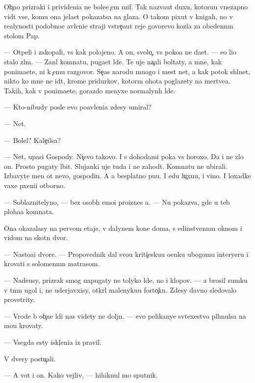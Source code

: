 \documentclass[10pt]{book}
\begin{document}
Ob{\yi}{\c}no prizraki i privideni{\y}a ne bole{\y}e {\c}em mif. Tak naz{\yi}va{\y}ut duxu, kotoru{\y}u vnezapno vid{\ia}t vse, komu ona jela{\y}et pokazatsa na glaza. O takom pixut v knigah, no v realynosti podobno{\y}e {\y}avleni{\y}e straji vstre{\c}a{\y}ut reje govor{\ia}{\x}evo kozla za obedenn{\yi}m stolom Pap{\yi}.

— Otpeli i zakopali, vs{\e} kak polojeno. A on, svolo{\c}, vs{\e} poko{\y}a ne da{\y}et. — {\y}e{\y}o li{\q}o stalo zl{\yi}m. — Zan{\ia}l komnatu, puga{\y}et l{\iu}de{\y}. Te uje na{\c}ali boltaty, a mne, kak ponima{\y}ete, ni k {\c}emu razgovor{\yi}. Se{\y}{\c}as narodu mnogo i mest net, a kak potok shl{\yi}net, nikto ko mne ne id{\e}t, krome pridurkov, kotor{\yi}m ohota poglazety na mertve{\q}a. Takih, kak v{\yi} ponima{\y}ete, gorazdo menyxe normalyn{\yi}h l{\iu}de{\y}.

— Kto-nibudy posle {\y}evo po{\y}avleni{\y}a zdesy umiral?

— Net.

— Bolel? Kale{\c}ilsa?

— Net, upasi Gospody. Ni{\c}evo takovo. I s dohodami poka vs{\e} horoxo. Da i ne zlo{\y} on. Prosto pugaty l{\iu}bit. Slujanki uje tuda i ne zahod{\ia}t. Komnatu ne ubirali. Izbavyte men{\ia} ot nevo, gospodin. A {\y}a besplatno pu{\x}u. I {\y}edu lu{\c}xu{\y}u, i vino. I loxadke vaxe{\y} pxeni{\q}i otborno{\y}.

— Soblaznitelyno, — bez osob{\yi}h emo{\q}i{\y} pro{\y}iznes {\y}a. — Nu pokaz{\yi}va{\y}, gde u teb{\ia} ploha{\y}a komnata.

Ona okazalasy na pervom etaje, v dalynem kon{\q}e doma, s {\y}edinstvenn{\yi}m oknom i vidom na skotn{\yi}{\y} dvor.

— Nasto{\y}a{\x}i{\y} dvore{\q}. — Propovednik dal svo{\y}u kriti{\c}esku{\y}u o{\q}enku ubogomu interyeru i krovati s solomenn{\yi}m matrasom.

— Nade{\y}usy, prizrak smog napugaty ne tolyko l{\iu}de{\y}, no i klopov. — {\Y}a brosil sumku v t{\e}mn{\yi}{\y} ugol i, ne uderjavxisy, otkr{\yi}l malenyku{\y}u forto{\c}ku. Zdesy davno sledovalo provetrity.

— Vrode b{\yi} ob{\yi}{\c}n{\yi}{\y}e l{\iu}di nas videty ne doljn{\yi}. — {\Y}evo pelikanye sv{\ia}te{\y}xestvo pl{\iu}hnulsa na mo{\y}u krovaty.

— Vsegda {\y}esty iskl{\iu}{\c}eni{\y}a iz pravil.

V dvery postu{\c}ali.

— A vot i on. Kako{\y} vejliv{\yi}{\y}, — hihiknul mo{\y} sputnik.
\end{document}
